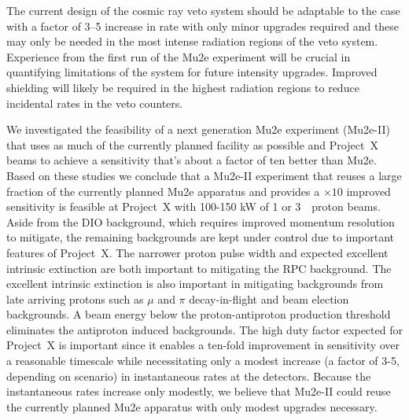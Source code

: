 The current design of the cosmic ray veto system should be adaptable
to the case with a factor of 3--5 increase in rate with only minor
upgrades required and these may only be needed in the most intense
radiation regions of the veto system.  Experience from the first run
of the Mu2e experiment will be crucial in quantifying limitations of
the system for future intensity upgrades.  Improved shielding will
likely be required in the highest radiation regions to reduce
incidental rates in the veto counters.



%


We investigated the feasibility of a next generation Mu2e experiment
(Mu2e-II) that uses as much of the currently planned facility as
possible and Project~X beams to achieve a sensitivity that's about a
factor of ten better than Mu2e.  Based on these studies we conclude
that a Mu2e-II experiment that reuses a large fraction of the
currently planned Mu2e apparatus and provides a $\times 10$ improved
sensitivity is feasible at Project~X with 100-150 kW of 1 or 3~\gev\
proton beams.  Aside from the DIO background, which requires improved
momentum resolution to mitigate, the remaining backgrounds are kept
under control due to important features of Project~X.  The narrower
proton pulse width and expected excellent intrinsic extinction are
both important to mitigating the RPC background.  The excellent
intrinsic extinction is also important in mitigating backgrounds from
late arriving protons such as $\mu$ and $\pi$ decay-in-flight and beam
election backgrounds.  A beam energy below the proton-antiproton production
threshold eliminates the antiproton induced backgrounds.  The high
duty factor expected for Project~X is important since it enables a
ten-fold improvement in sensitivity over a reasonable timescale while
necessitating only a modest increase (a factor of 3-5, depending on
scenario) in instantaneous rates at the detectors.  Because the
instantaneous rates increase only modestly, we believe that Mu2e-II
could reuse the currently planned Mu2e apparatus with only modest
upgrades necessary.
